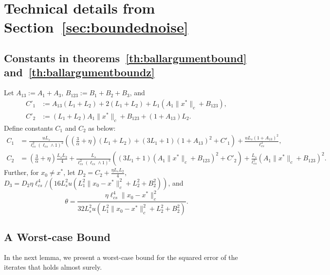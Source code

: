 \documentclass{article}
\newcommand{\lrp}[1]{\left( #1 \right)}
\newcommand{\lcs}{\ell_{cs}}
\begin{document}



\appendix

\section{Technical details from Section~\ref{sec:boundednoise}}
\subsection{Constants in theorems~\ref{th:ballargumentbound} and~\ref{th:ballargumentboundz}}\label{app:const_ball}
Let $A_{13} := A_1+A_3$, $B_{123} := B_1 + B_2 + B_3$, and 
\begin{align*}
    C'_1 &:= A_{13}(L_1+L_2) + 2(L_1+L_2) + L_1\lrp{A_1\|x^*\|_c + B_{123}}, \\
    C'_2 &:= (L_1 + L_2){A_1 \|x^*\|_c + B_{123}} + (1+A_{13})L_2.\end{align*}
Define constants $C_1$ and $C_2$ as below: 
\begin{align*}
C_1 &= \tfrac{u L_s}{\lcs^2\lrp{\lcs\wedge 1}^2} \lrp{\lrp{\tfrac{3}{\alpha} + \eta}(L_1+L_2) + (3L_1+1) (1+A_{13})^2 + C'_1} + \tfrac{u L_s(1+A_{13})^2}{\lcs^2},\\
C_2 &=   \lrp{\tfrac{3}{\alpha} + \eta} \tfrac{L_sL_2}{4} + \tfrac{ L_s }{\lcs^2 \lrp{\lcs \wedge 1}^2}\lrp{(3L_1+1) (A_{1} \|x^*\|_c + B_{123})^2 + C'_2} + \tfrac{L_s}{\lcs^2}\lrp{A_1\|x^*\|_c + B_{123}}^2.\end{align*}   
Further, for $x_0 \ne x^*$, let $D_2 = C_2 + \tfrac{\eta L_sL_2}{4}$, $D_3 =  { D_2 \eta \lcs^4 }/({16 L^2_s u  \lrp{L^2_1\|x_0 - x^*\|^2_c + L^2_2 + B^2_2} })$, and 
\[\theta =  \frac{\eta \lcs^4 \|x_0 - x^*\|^2_c}{32 L^2_s u  \lrp{L^2_1\|x_0 - x^*\|^2_c + L^2_2 + B^2_2} }.\]

\subsection{A Worst-case Bound}\label{app:wc}
In the next lemma, we present a worst-case bound for the squared error of the iterates that holds almost surely. %
\end{document}
